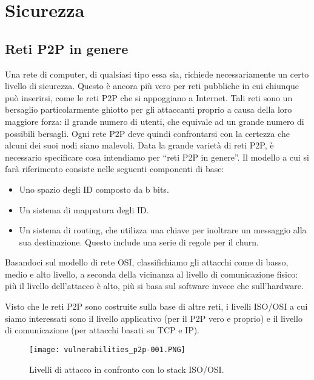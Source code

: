 \chapter{Sicurezza}\label{sicurezza}

\section{Reti P2P in genere}\label{reti-p2p-in-genere}

Una rete di computer, di qualsiasi tipo essa sia, richiede    necessariamente un certo livello di sicurezza. Questo è ancora più vero per reti pubbliche in cui chiunque può inserirsi, come le reti P2P che
si appoggiano a Internet.
Tali reti sono un bersaglio particolarmente ghiotto per gli attaccanti proprio a causa della loro maggiore forza: il grande numero di utenti,
che equivale ad un grande numero di possibili bersagli. Ogni rete P2P deve quindi confrontarsi con la certezza che alcuni dei suoi nodi siano
malevoli.  Data la grande varietà di reti P2P, è necessario specificare cosa intendiamo per ``reti P2P in genere''. Il modello \cite{vulnerabilities} a cui si farà riferimento consiste nelle seguenti componenti di base:

\begin{itemize}
\itemsep1pt\parskip0pt
\item
  Uno spazio degli ID composto da b bits.
\item
  Un sistema di mappatura degli ID.
\item
  Un sistema di routing, che utilizza una chiave per inoltrare un   messaggio alla sua destinazione. Questo include una serie di regole   per il churn.
\end{itemize}


Basandoci sul modello di rete OSI, classifichiamo gli attacchi come di basso, medio e alto livello, a seconda della vicinanza al livello di comunicazione fisico: più il livello dell'attacco è alto, più si basa sul software invece che sull'hardware.

Visto che le reti P2P sono costruite sulla base di altre reti, i livelli ISO/OSI a cui siamo interessati sono il livello applicativo (per il P2P vero e proprio) e il livello di comunicazione (per attacchi basati su TCP e IP).

\begin{figure}[htbp]
\centering
\texttt{[image: vulnerabilities\_p2p-001.PNG]}
\caption{Livelli di attacco in confronto con lo stack ISO/OSI.\label{vulnerabilities_p2p-001}}
\end{figure}

